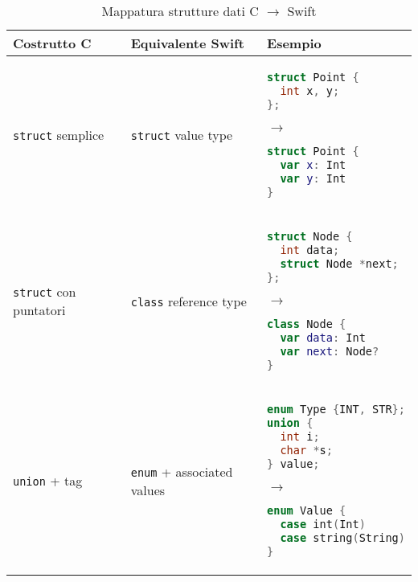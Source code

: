 \begin{table}[h]
\centering
\small
\begin{tabular}{@{}p{4cm}p{5cm}p{4cm}@{}}
\toprule
\textbf{Costrutto C} & \textbf{Equivalente Swift} & \textbf{Esempio} \\
\midrule
\texttt{struct} semplice & \texttt{struct} value type & 
\begin{minipage}{4cm}\begin{lstlisting}[language=C,basicstyle=\tiny\ttfamily]
struct Point {
  int x, y;
};
\end{lstlisting}\end{minipage}
$\to$
\begin{minipage}{4cm}\begin{lstlisting}[language=Swift,basicstyle=\tiny\ttfamily]
struct Point {
  var x: Int
  var y: Int
}
\end{lstlisting}\end{minipage} \\
\midrule

\texttt{struct} con puntatori & \texttt{class} reference type & 
\begin{minipage}{4cm}\begin{lstlisting}[language=C,basicstyle=\tiny\ttfamily]
struct Node {
  int data;
  struct Node *next;
};
\end{lstlisting}\end{minipage}
$\to$
\begin{minipage}{4cm}\begin{lstlisting}[language=Swift,basicstyle=\tiny\ttfamily]
class Node {
  var data: Int
  var next: Node?
}
\end{lstlisting}\end{minipage} \\
\midrule

\texttt{union} + tag & \texttt{enum} + associated values & 
\begin{minipage}{4cm}\begin{lstlisting}[language=C,basicstyle=\tiny\ttfamily]
enum Type {INT, STR};
union {
  int i;
  char *s;
} value;
\end{lstlisting}\end{minipage}
$\to$
\begin{minipage}{4cm}\begin{lstlisting}[language=Swift,basicstyle=\tiny\ttfamily]
enum Value {
  case int(Int)
  case string(String)
}
\end{lstlisting}\end{minipage} \\
\bottomrule
\end{tabular}
\caption{Mappatura strutture dati C $\to$ Swift}
\label{tab:struct_mapping}
\end{table}

